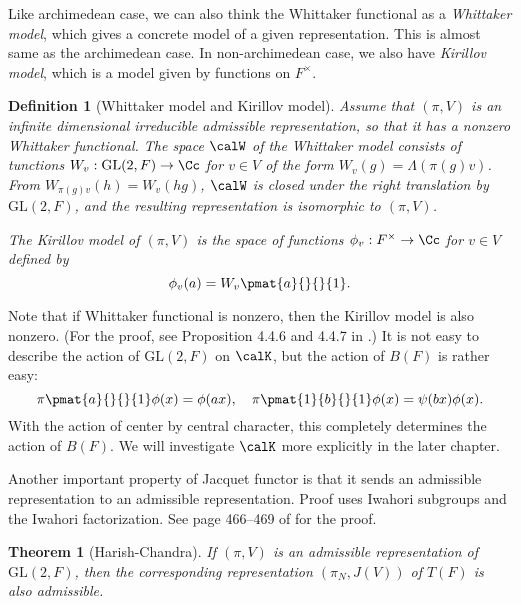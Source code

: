 \documentclass{article}
\newtheorem{theorem}{Theorem}[section]
\newtheorem{definition}{Definition}[section]
\newcommand{\GL}{\mathrm{GL}}
\begin{document}
Like archimedean case, we can also think the Whittaker functional as a \emph{Whittaker model}, which gives a concrete model of a given representation. This is almost same as the archimedean case. 
In non-archimedean case, we also have \emph{Kirillov model}, which is a model given by functions on $F^{\times}$. 
\begin{definition}[Whittaker model and Kirillov model]
Assume that $(\pi, V)$ is an infinite dimensional irreducible admissible representation, so that it has a nonzero Whittaker functional.  The space $\calW$ of the Whittaker model consists of tunctions $W_{v}:\GL(2, F) \to \Cc$ for $v\in V$ of the form $W_{v}(g) = \Lambda(\pi(g)v)$. From $W_{\pi(g)v}(h) = W_{v}(hg)$,  $\calW$ is closed under the right translation by $\GL(2, F)$, and the resulting representation is isomorphic to $(\pi, V)$. 

The Kirillov model of $(\pi, V)$ is the space of functions $\phi_v:F^{\times} \to \Cc$ for $v\in V$ defined by 
$$
\phi_v(a) = W_{v} \pmat{a}{}{}{1}. 
$$
\end{definition}
Note that if Whittaker functional is nonzero, then the Kirillov model is also nonzero. (For the proof, see Proposition 4.4.6 and 4.4.7 in \cite{bu}.) It is not easy to describe the action of $\GL(2, F)$ on $\calK$, but the action of $B(F)$ is rather easy: 
$$
\pi\pmat{a}{}{}{1} \phi(x) = \phi(ax), \quad \pi\pmat{1}{b}{}{1}\phi(x) = \psi(bx)\phi(x). 
$$
With the action of center by central character, this completely determines the action of $B(F)$. We will investigate $\calK$ more explicitly in the later chapter. 

Another important property of Jacquet functor is that it sends an admissible representation to an admissible representation. Proof uses Iwahori subgroups and the Iwahori factorization. See page 466--469 of \cite{bu} for the proof. 
\begin{theorem}[Harish-Chandra]
\label{jacadm}
If $(\pi, V)$ is an admissible representation of $\GL(2, F)$, then the corresponding representation $(\pi_N, J(V))$ of $T(F)$ is also admissible.
\end{theorem}
\end{document}
